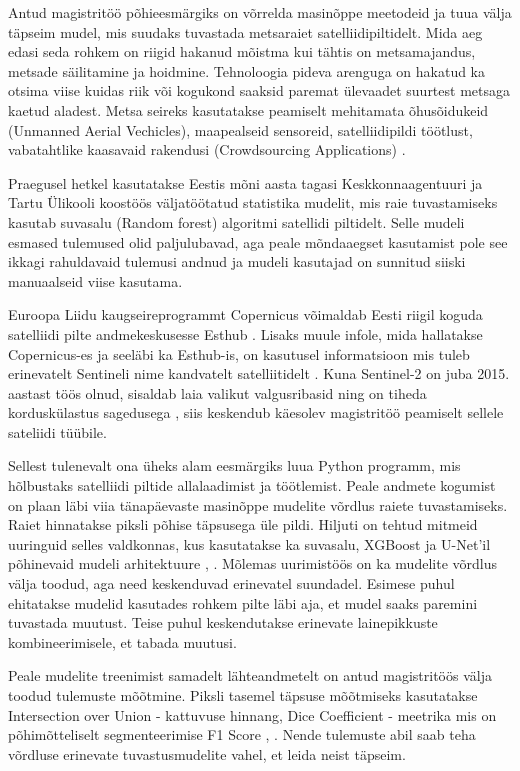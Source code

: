 Antud magistritöö põhieesmärgiks on võrrelda masinõppe meetodeid ja tuua välja täpseim mudel, mis suudaks tuvastada metsaraiet satelliidipiltidelt. Mida aeg edasi seda rohkem on riigid hakanud mõistma kui tähtis on metsamajandus, metsade säilitamine ja hoidmine. Tehnoloogia pideva arenguga on hakatud ka otsima viise kuidas riik või kogukond saaksid paremat ülevaadet suurtest metsaga kaetud aladest. Metsa seireks kasutatakse peamiselt mehitamata õhusõidukeid (Unmanned Aerial Vechicles), maapealseid sensoreid, satelliidipildi töötlust, vabatahtlike kaasavaid rakendusi (Crowdsourcing Applications) \cite{cheungPerimeterDefense42015}.

Praegusel hetkel kasutatakse Eestis mõni aasta tagasi Keskkonnaagentuuri ja Tartu Ülikooli koostöös väljatöötatud statistika mudelit, mis raie tuvastamiseks kasutab suvasalu (Random forest) algoritmi \cite{TartuUlikooliTeadlased2020} satellidi piltidelt. Selle mudeli esmased tulemused olid paljulubavad, aga peale mõndaaegset kasutamist pole see ikkagi rahuldavaid tulemusi andnud ja mudeli kasutajad on sunnitud siiski manuaalseid viise kasutama.

Euroopa Liidu kaugseireprogrammt Copernicus võimaldab Eesti riigil koguda satelliidi pilte andmekeskusesse Esthub \cite{maa-ametRiiklikSatelliidiandmeteKeskus}. Lisaks muule infole, mida hallatakse Copernicus-es ja seeläbi ka Esthub-is, on kasutusel informatsioon mis tuleb erinevatelt Sentineli nime kandvatelt satelliitidelt \cite{InfrastructureOverviewCopernicus}. Kuna Sentinel-2 on juba 2015. aastast töös olnud, sisaldab laia valikut valgusribasid ning on tiheda korduskülastus sagedusega \cite{Sentinel2OverviewScienceDirect}, siis keskendub käesolev magistritöö peamiselt sellele sateliidi tüübile.

Sellest tulenevalt ona üheks alam eesmärgiks luua Python programm, mis hõlbustaks satelliidi piltide allalaadimist ja töötlemist. Peale andmete kogumist on plaan läbi viia tänapäevaste masinõppe mudelite võrdlus raiete tuvastamiseks. Raiet hinnatakse piksli põhise täpsusega üle pildi. Hiljuti on tehtud mitmeid uuringuid selles valdkonnas, kus kasutatakse ka suvasalu, XGBoost ja U-Net’il põhinevaid mudeli arhitektuure \cite{isaienkovDeepLearningRegular2021}, \cite{podoprigorovaRecognitionForestDamage2024}. Mõlemas uurimistöös on ka mudelite võrdlus välja toodud, aga need keskenduvad erinevatel suundadel. Esimese puhul ehitatakse mudelid kasutades rohkem pilte läbi aja, et mudel saaks paremini tuvastada muutust. Teise puhul keskendutakse erinevate lainepikkuste kombineerimisele, et tabada muutusi. 

Peale mudelite treenimist samadelt lähteandmetelt on antud magistritöös välja toodud tulemuste mõõtmine. Piksli tasemel täpsuse mõõtmiseks kasutatakse Intersection over Union - kattuvuse hinnang, Dice Coefficient - meetrika mis on põhimõtteliselt segmenteerimise F1 Score \cite{IntersectionUnionIoU}, \cite{UnderstandingDICECOEFFICIENT}. Nende tulemuste abil saab teha võrdluse erinevate tuvastusmudelite vahel, et leida neist täpseim.
